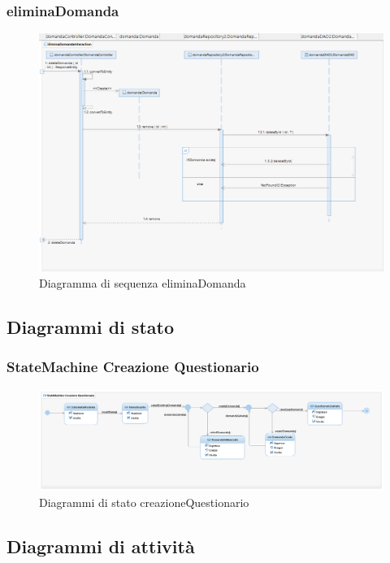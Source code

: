 \documentclass[12pt]{article}
\begin{document}
\subsubsection{eliminaDomanda}
\begin{figure}[H]
\centering
\includegraphics[scale=0.7]{UNIMIBModule_EliminaDomandaSequenceDiagram.png}
\caption{Diagramma di sequenza eliminaDomanda}
\end{figure}
\subsection{Diagrammi di stato}
\subsubsection{StateMachine Creazione Questionario}
\begin{figure}[H]
\centering
\includegraphics[scale=0.40]{UNIMIBModule_StatemachineDiagramCreazioneQuestionario.png}
\caption{Diagrammi di stato creazioneQuestionario}
\end{figure}
\subsection{Diagrammi di attivit\`{a}}
\end{document}
